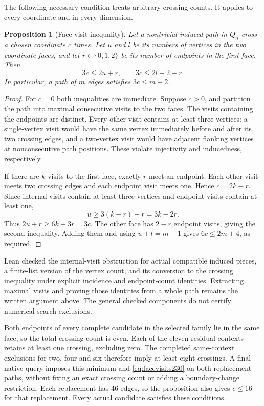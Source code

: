 \documentclass[11pt,a4paper]{article}
\newtheorem{proposition}[theorem]{Proposition}
\theoremstyle{definition}
\theoremstyle{remark}
\begin{document}
The following necessary condition treats arbitrary crossing counts.
It applies to every coordinate and in every dimension.

\begin{proposition}[Face-visit inequality]\label{prop:facevisits230}
Let a nontrivial induced path in $Q_n$ cross a chosen coordinate $c$
times. Let $u$ and $l$ be its numbers of vertices in the two coordinate
faces, and let $r\in\{0,1,2\}$ be its number of endpoints in the first
face. Then
\begin{equation}\label{eq:facevisits230}
3c\le 2u+r,\qquad 3c\le 2l+2-r.
\end{equation}
In particular, a path of $m$ edges satisfies $3c\le m+2$.
\end{proposition}
\begin{proof}
For $c=0$ both inequalities are immediate. Suppose $c>0$, and partition
the path into maximal consecutive visits to the two faces. The visits
containing the endpoints are distinct. Every other visit contains at
least three vertices: a single-vertex visit would have the same vertex
immediately before and after its two crossing edges, and a two-vertex
visit would have adjacent flanking vertices at nonconsecutive path
positions. These violate injectivity and inducedness, respectively.

If there are $k$ visits to the first face, exactly $r$ meet an endpoint.
Each other visit meets two crossing edges and each endpoint visit meets
one. Hence $c=2k-r$. Since internal visits contain at least three
vertices and endpoint visits contain at least one,
\[
u\ge 3(k-r)+r=3k-2r.
\]
Thus $2u+r\ge 6k-3r=3c$. The other face has $2-r$ endpoint visits,
giving the second inequality. Adding them and using $u+l=m+1$ gives
$6c\le2m+4$, as required.
\end{proof}

Lean checked the internal-visit obstruction for actual compatible
induced pieces, a finite-list version of the vertex count, and its
conversion to the crossing inequality under explicit incidence and
endpoint-count identities. Extracting maximal visits and proving those
identities from a whole path remains the written argument above. The
general checked components do not certify numerical search exclusions.

Both endpoints of every complete candidate in the selected family lie
in the same face, so the total crossing count is even. Each of the eleven
residual contexts retains at least one crossing, excluding zero. The
completed same-context exclusions for two, four and six therefore imply
at least eight crossings. A final native query imposes this minimum and
\eqref{eq:facevisits230} on both replacement paths, without fixing an
exact crossing count or adding a boundary-change restriction. Each
replacement has 46 edges, so the proposition also gives $c\le16$ for
that replacement. Every actual candidate satisfies these conditions.
\end{document}
